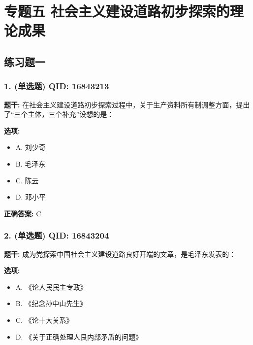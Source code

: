\documentclass[12pt,UTF8]{ctexart}
\begin{document}
\vspace{0.3em}\hrulefill\vspace{0.7em}

\section*{专题五 社会主义建设道路初步探索的理论成果}
\hrulefill

\subsection*{练习题一}

\subsubsection*{1. (单选题) \small QID: 16843213}

\textbf{题干:}
在社会主义建设道路初步探索过程中，关于生产资料所有制调整方面，提出了“三个主体，三个补充”设想的是：

\textbf{选项:}
\begin{itemize}[leftmargin=*]

  \item A. 刘少奇

  \item B. 毛泽东

  \item C. 陈云

  \item D. 邓小平

\end{itemize}

\textbf{正确答案:}
C

\vspace{0.3em}\hrulefill\vspace{0.7em}

\subsubsection*{2. (单选题) \small QID: 16843204}

\textbf{题干:}
成为党探索中国社会主义建设道路良好开端的文章，是毛泽东发表的：

\textbf{选项:}
\begin{itemize}[leftmargin=*]

  \item A. 《论人民民主专政》

  \item B. 《纪念孙中山先生》

  \item C. 《论十大关系》

  \item D. 《关于正确处理人艮内部矛盾的问题》

\end{itemize}
\end{document}
